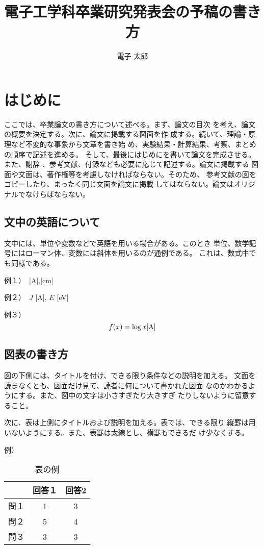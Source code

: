 \documentclass{jarticle}
\title{電子工学科卒業研究発表会の予稿の書き方} %
\author{電子 太郎}%
\begin{document}
%
\maketitle %

\section{はじめに}%
ここでは、卒業論文の書き方について述べる。まず、論文の目次
を考え、論文の概要を決定する。次に、論文に掲載する図面を作
成する。続いて、理論・原理など不変的な事象から文章を書き始
め、実験結果・計算結果、考察、まとめの順序で記述を進める。
そして、最後にはじめにを書いて論文を完成させる。また、謝辞
、参考文献、付録なども必要に応じて記述する。論文に掲載する
図面や文面は、著作権等を考慮しなければならない。そのため、
参考文献の図をコピーしたり、まったく同じ文面を論文に掲載
してはならない。論文はオリジナルでなけらばならない。
\subsection{文中の英語について}%
文中には、単位や変数などで英語を用いる場合がある。このとき
単位、数学記号にはローマン体、変数には斜体を用いるのが通例である。
これは、数式中でも同様である。\par
例１）　[A],[cm] \par
例２）　$J$ [A], $E$ [eV] \par
例３）
\begin{equation}
f(x) = \log x {\rm [A]}
\end{equation}

\subsection{図表の書き方}%
図の下側には、タイトルを付け、できる限り条件などの説明を加える。
文面を読まなくとも、図面だけ見て、読者に何について書かれた図面
なのかわかるようにする。また、図中の文字は小さすぎたり大きすぎ
たりしないように留意すること\cite{ref:1}。\par%
次に、表は上側にタイトルおよび説明を加える。表では、できる限り
縦罫は用いないようにする。また、表罫は太線とし、横罫もできるだ
け少なくする。\par%
例）
\begin{table}[h]
  \begin{center}
  \caption{表の例}%
    \begin{tabular}{ccc} \hline
         & 回答１ & 回答2 \\ \hline
    問１ & 1 &  3 \\
    問２ & 5 &  4 \\
    問３ & 3 &  3 \\ \hline
    \end{tabular}
  \end{center}
\end{table}
\end{document}
